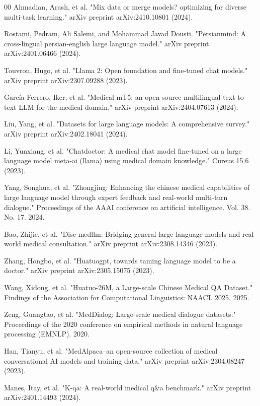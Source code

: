 \documentclass[review]{elsarticle}
\begin{document}
\begin{thebibliography}{00}
Ahmadian, Arash, et al. "Mix data or merge models? optimizing for diverse multi-task learning." arXiv preprint arXiv:2410.10801 (2024).

Rostami, Pedram, Ali Salemi, and Mohammad Javad Dousti. "Persianmind: A cross-lingual persian-english large language model." arXiv preprint arXiv:2401.06466 (2024).

Touvron, Hugo, et al. "Llama 2: Open foundation and fine-tuned chat models." arXiv preprint arXiv:2307.09288 (2023).

García-Ferrero, Iker, et al. "Medical mT5: an open-source multilingual text-to-text LLM for the medical domain." arXiv preprint arXiv:2404.07613 (2024).

Liu, Yang, et al. "Datasets for large language models: A comprehensive survey." arXiv preprint arXiv:2402.18041 (2024).

Li, Yunxiang, et al. "Chatdoctor: A medical chat model fine-tuned on a large language model meta-ai (llama) using medical domain knowledge." Cureus 15.6 (2023).

Yang, Songhua, et al. "Zhongjing: Enhancing the chinese medical capabilities of large language model through expert feedback and real-world multi-turn dialogue." Proceedings of the AAAI conference on artificial intelligence. Vol. 38. No. 17. 2024.

Bao, Zhijie, et al. "Disc-medllm: Bridging general large language models and real-world medical consultation." arXiv preprint arXiv:2308.14346 (2023).

Zhang, Hongbo, et al. "Huatuogpt, towards taming language model to be a doctor." arXiv preprint arXiv:2305.15075 (2023).

Wang, Xidong, et al. "Huatuo-26M, a Large-scale Chinese Medical QA Dataset." Findings of the Association for Computational Linguistics: NAACL 2025. 2025.

Zeng, Guangtao, et al. "MedDialog: Large-scale medical dialogue datasets." Proceedings of the 2020 conference on empirical methods in natural language processing (EMNLP). 2020.

Han, Tianyu, et al. "MedAlpaca--an open-source collection of medical conversational AI models and training data." arXiv preprint arXiv:2304.08247 (2023).

Manes, Itay, et al. "K-qa: A real-world medical q\&a benchmark." arXiv preprint arXiv:2401.14493 (2024).


\end{thebibliography}
\end{document}
